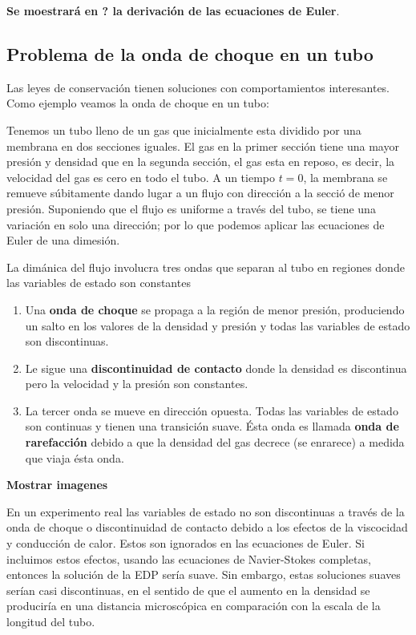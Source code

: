 \textbf{Se moestrará en ? la derivación de las ecuaciones de Euler}.


\subsection{Problema de la onda de choque en un tubo}

Las leyes de conservación tienen soluciones con comportamientos interesantes. Como ejemplo veamos la onda de choque en un tubo:

Tenemos un tubo lleno de un gas que inicialmente esta dividido por una membrana en dos secciones iguales. El gas en la primer sección tiene una mayor presión y densidad que en la segunda sección, el gas esta en reposo, es decir, la velocidad del gas es cero en todo el tubo. A un tiempo $t=0$, la membrana se remueve súbitamente dando lugar a un flujo con dirección a la secció de menor presión. Suponiendo que el flujo es uniforme a través del tubo, se tiene una variación en solo una dirección; por lo que podemos aplicar las ecuaciones de Euler de una dimesión.

La dimánica del flujo involucra tres ondas que separan al tubo en regiones donde las variables de estado son constantes

\begin{enumerate}
\item Una \textbf{onda de choque} se propaga a la región de menor presión, produciendo un salto en los valores de la densidad y presión y todas las variables de estado son discontinuas.
\item Le sigue una \textbf{discontinuidad de contacto} donde la densidad es discontinua pero la velocidad y la presión son constantes.
\item La tercer onda se mueve en dirección opuesta. Todas las variables de estado son continuas y tienen una transición suave. Ésta onda es llamada \textbf{onda de rarefacción} debido a que la densidad del gas decrece (se enrarece) a medida que viaja ésta onda.
\end{enumerate}


\textbf{Mostrar imagenes}

En un experimento real las variables de estado no son discontinuas a través de la onda de choque o discontinuidad de contacto  debido a los efectos de la viscocidad y conducción de calor. Estos son ignorados en las ecuaciones de Euler. Si incluimos estos efectos, usando las ecuaciones de Navier-Stokes completas, entonces la solución de la EDP sería suave. Sin embargo, estas soluciones suaves serían casi discontinuas, en el sentido de que el aumento en la densidad se produciría en una distancia microscópica en comparación con la escala de la longitud del tubo.

